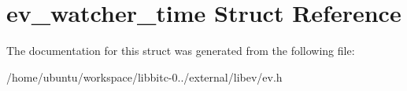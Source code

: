 \hypertarget{structev__watcher__time}{\section{ev\-\_\-watcher\-\_\-time Struct Reference}
\label{structev__watcher__time}
}


The documentation for this struct was generated from the following file\-:\begin{DoxyCompactItemize}
\item 
/home/ubuntu/workspace/libbitc-\/0../external/libev/ev.\-h\end{DoxyCompactItemize}
